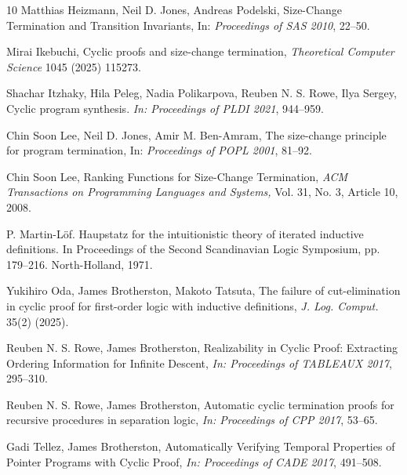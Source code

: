 \begin{thebibliography}{10}
Matthias Heizmann, Neil D. Jones, Andreas Podelski,
Size-Change Termination and Transition Invariants,
In: {\em Proceedings of SAS 2010}, 22--50.

Mirai Ikebuchi, Cyclic proofs and size-change termination,
{\em Theoretical Computer Science} 1045 (2025) 115273.

Shachar Itzhaky, Hila Peleg, Nadia Polikarpova, Reuben N. S. Rowe, Ilya Sergey,
Cyclic program synthesis. 
{\em In: Proceedings of PLDI 2021}, 944--959.

Chin Soon Lee, Neil D. Jones, Amir M. Ben-Amram,
The size-change principle for program termination,
In: {\em Proceedings of POPL 2001}, 81--92.

Chin Soon Lee,
Ranking Functions for Size-Change Termination,
{\em ACM Transactions on Programming Languages and Systems,} Vol. 31, No. 3, Article 10, 2008.

P. Martin-L\"of. Haupstatz for the intuitionistic theory of iterated inductive definitions. In Proceedings of the Second Scandinavian Logic Symposium, pp. 179–216. North-Holland,
1971.

Yukihiro Oda, James Brotherston, Makoto Tatsuta,
The failure of cut-elimination in cyclic proof for first-order logic with inductive definitions,
{\em J. Log. Comput.} 35(2) (2025).


Reuben N. S. Rowe, James Brotherston,
Realizability in Cyclic Proof: Extracting Ordering Information for Infinite Descent,
{\em In: Proceedings of TABLEAUX 2017}, 295--310.

Reuben N. S. Rowe, James Brotherston,
Automatic cyclic termination proofs for recursive procedures in separation logic, 
{\em In: Proceedings of CPP 2017}, 53--65.

Gadi Tellez, James Brotherston,
Automatically Verifying Temporal Properties of Pointer Programs with Cyclic Proof,
{\em In: Proceedings of CADE 2017}, 491--508.

\end{thebibliography}
